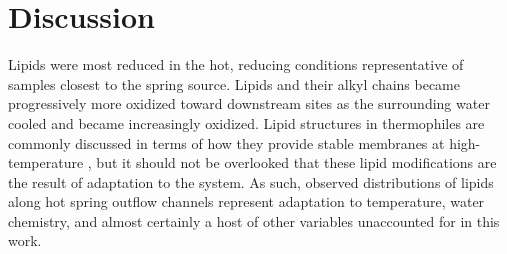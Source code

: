 

\section{Discussion}

Lipids were most reduced in the hot, reducing conditions representative of samples closest to the spring source. Lipids and their alkyl chains became progressively more oxidized toward downstream sites as the surrounding water cooled and became increasingly oxidized. Lipid structures in thermophiles are commonly discussed in terms of how they provide stable membranes at high-temperature \citep{daniel2000biomolecular}, but it should not be overlooked that these lipid modifications are the result of adaptation to the system. As such, observed distributions of lipids along hot spring outflow channels represent adaptation to temperature, water chemistry, and almost certainly a host of other variables unaccounted for in this work.

